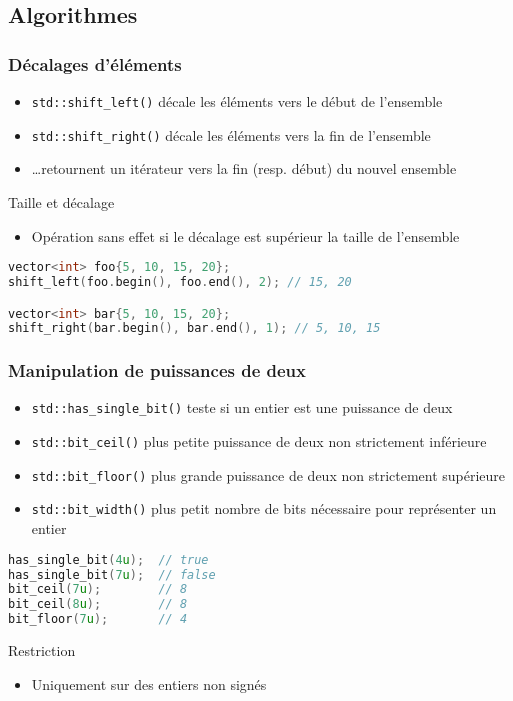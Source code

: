 \documentclass[C++.tex]{subfiles}
\begin{document}
\subsection*{Algorithmes}
\begin{frame}[fragile]
	\frametitle{Décalages d'éléments}
	\begin{itemize}
		\item \lstinline|std::shift_left()| décale les éléments vers le début de l'ensemble
		\item \lstinline|std::shift_right()| décale les éléments vers la fin de l'ensemble
		\item \ldots retournent un itérateur vers la fin (resp. début) du nouvel ensemble
	\end{itemize}

	\begin{block}{Taille et décalage}
		\begin{itemize}
			\item Opération sans effet si le décalage est supérieur la taille de l'ensemble
		\end{itemize}
	\end{block}

	\begin{lstlisting}[language=C++]
vector<int> foo{5, 10, 15, 20};
shift_left(foo.begin(), foo.end(), 2); // 15, 20

vector<int> bar{5, 10, 15, 20};
shift_right(bar.begin(), bar.end(), 1); // 5, 10, 15\end{lstlisting}
\end{frame}

\begin{frame}[fragile]
	\frametitle{Manipulation de puissances de deux}
	\begin{itemize}
		\item \lstinline|std::has_single_bit()| teste si un entier est une puissance de deux
		\item \lstinline|std::bit_ceil()| plus petite puissance de deux non strictement inférieure
		\item \lstinline|std::bit_floor()| plus grande puissance de deux non strictement supérieure
		\item \lstinline|std::bit_width()| plus petit nombre de bits nécessaire pour représenter un entier
	\end{itemize}

	\begin{lstlisting}[language=C++]
has_single_bit(4u);  // true
has_single_bit(7u);  // false
bit_ceil(7u);        // 8
bit_ceil(8u);        // 8
bit_floor(7u);       // 4\end{lstlisting}

	\begin{alertblock}{Restriction}
		\begin{itemize}
			\item Uniquement sur des entiers non signés
		\end{itemize}
	\end{alertblock}
\end{frame}
\end{document}
